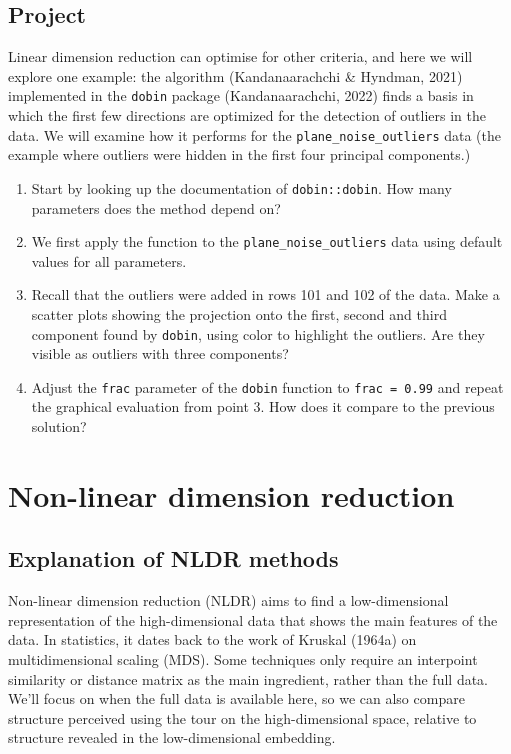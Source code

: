 \documentclass[
  letterpaper,
]{krantz}
\providecommand{\tightlist}{%
  \setlength{\itemsep}{0pt}\setlength{\parskip}{0pt}}\usepackage{longtable,booktabs,array}
\begin{document}
\section*{Project}\label{project}


Linear dimension reduction can optimise for other criteria, and here we
will explore one example: the algorithm (Kandanaarachchi \& Hyndman,
2021) implemented in the \texttt{dobin} package (Kandanaarachchi, 2022)
finds a basis in which the first few directions are optimized for the
detection of outliers in the data. We will examine how it performs for
the \texttt{plane\_noise\_outliers} data (the example where outliers
were hidden in the first four principal components.)

\begin{enumerate}
\def\labelenumi{\arabic{enumi}.}
\tightlist
\item
  Start by looking up the documentation of \texttt{dobin::dobin}. How
  many parameters does the method depend on?
\item
  We first apply the function to the \texttt{plane\_noise\_outliers}
  data using default values for all parameters.
\item
  Recall that the outliers were added in rows 101 and 102 of the data.
  Make a scatter plots showing the projection onto the first, second and
  third component found by \texttt{dobin}, using color to highlight the
  outliers. Are they visible as outliers with three components?
\item
  Adjust the \texttt{frac} parameter of the \texttt{dobin} function to
  \texttt{frac\ =\ 0.99} and repeat the graphical evaluation from point
  3. How does it compare to the previous solution?
\end{enumerate}


\chapter{Non-linear dimension
reduction}\label{non-linear-dimension-reduction}

\section{Explanation of NLDR methods}\label{explanation-of-nldr-methods}

Non-linear dimension reduction (NLDR) aims to find a low-dimensional
representation of the high-dimensional data that shows the main features
of the data. In statistics, it dates back to the work of Kruskal (1964a)
on multidimensional scaling (MDS). Some techniques only require an
interpoint similarity or distance matrix as the main ingredient, rather
than the full data. We'll focus on when the full data is available here,
so we can also compare structure perceived using the tour on the
high-dimensional space, relative to structure revealed in the
low-dimensional embedding.
\end{document}

